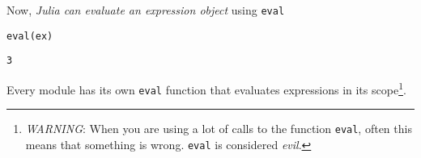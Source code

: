 \documentclass[letterpaper]{tufte-handout}
\begin{document}
Now, \emph{Julia can evaluate an expression object} using \texttt{eval}

\begin{verbatim}
eval(ex)
\end{verbatim}

\begin{verbatim}
3
\end{verbatim}


Every module has its own \texttt{eval} function that evaluates expressions in
its scope\footnote{\emph{WARNING}: When you are using a lot of calls to the
function \texttt{eval}, often this means that something is wrong. \texttt{eval} is
considered \emph{evil}.}.



\end{document}
